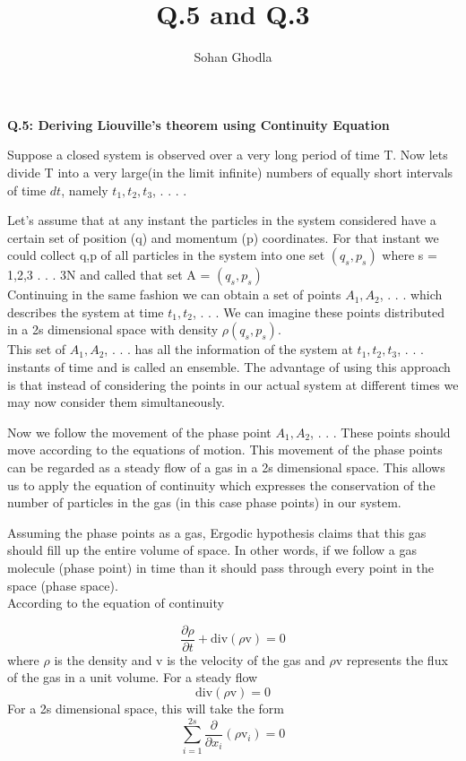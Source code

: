 \documentclass[12pt]{article}
\begin{document}
\title{Q.5 and Q.3}
\author{Sohan Ghodla}

\maketitle

\textbf {Q.5: Deriving Liouville's theorem using Continuity Equation}

Suppose a closed system is observed over a very long period of time T. Now lets divide T into a very large(in the limit infinite) numbers of equally short intervals of time $dt$, namely $t_1, t_2, t_3$, . . . . 

Let's assume that at any instant the particles in the system considered have a certain set of position (q) and momentum (p) coordinates. For that instant we could collect q,p of all particles in the system into one set $(q_s,p_s)$ where s = 1,2,3 . . . 3N and called that set A = $(q_s,p_s)$\\

 Continuing in the same fashion we can obtain a set of points $A_1, A_2$, . . . which describes the system at time $t_1, t_2$, . . . We can imagine these points distributed in a 2s dimensional space with density  $\rho(q_s,p_s)$.\\

This set of $A_1, A_2$, . . . has all the information of the system at $t_1, t_2, t_3$, . . . instants of time and is called an ensemble. The advantage of using this approach is that instead of considering the points in our actual system at different times we may now consider them simultaneously.

Now we follow the movement of the phase point $A_1, A_2$, . . . These points should move according to the equations of motion.
This movement of the phase points can be regarded as a steady flow of a gas in a 2s dimensional space. This allows us to apply the equation of continuity which expresses the conservation of the number of particles in the gas (in this case phase points) in our system.

Assuming the phase points as a gas, Ergodic hypothesis claims that this gas  should fill up the entire volume of space. In other words, if we follow a gas molecule (phase point) in time than it should pass through every point in the space (phase space). \\
According to the equation of continuity

$$\frac{\partial\rho} {\partial t} +   \mathrm{div}(\rho \mathrm{v}) = 0$$
where $\rho$ is the density and v is the velocity of the gas and $\rho$v represents the flux of the gas in a unit volume. For a steady flow $$\mathrm{div}(\rho \mathrm{v}) = 0$$
For a 2s dimensional space, this will take the form $$ \displaystyle\sum_{i=1}^{2s}\frac{\partial}{\partial x_i}(\rho\mathrm{v}_i) = 0$$ 
\end{document}
